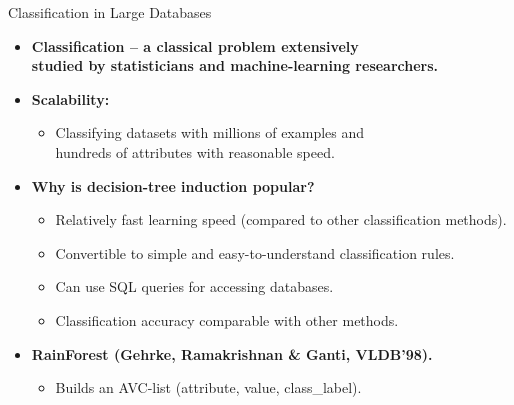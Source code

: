 \begin{frame}{Classification in Large Databases}
	\begin{itemize}
		\item \textbf{Classification -- a classical problem extensively \\ studied by statisticians and machine-learning researchers.}
		\item \textbf{Scalability:}
		      \begin{itemize}
			      \item Classifying datasets with millions of examples and \\ hundreds of attributes with reasonable speed.
		      \end{itemize}
		\item \textbf{Why is decision-tree induction popular?}
		      \begin{itemize}
			      \item Relatively fast learning speed (compared to other classification methods).
			      \item Convertible to simple and easy-to-understand classification rules.
			      \item Can use SQL queries for accessing databases.
			      \item Classification accuracy comparable with other methods.
		      \end{itemize}
		\item \textbf{RainForest (Gehrke, Ramakrishnan \& Ganti, VLDB'98).}
		      \begin{itemize}
			      \item Builds an AVC-list (attribute, value, class\_label).
		      \end{itemize}
	\end{itemize}
\end{frame}


